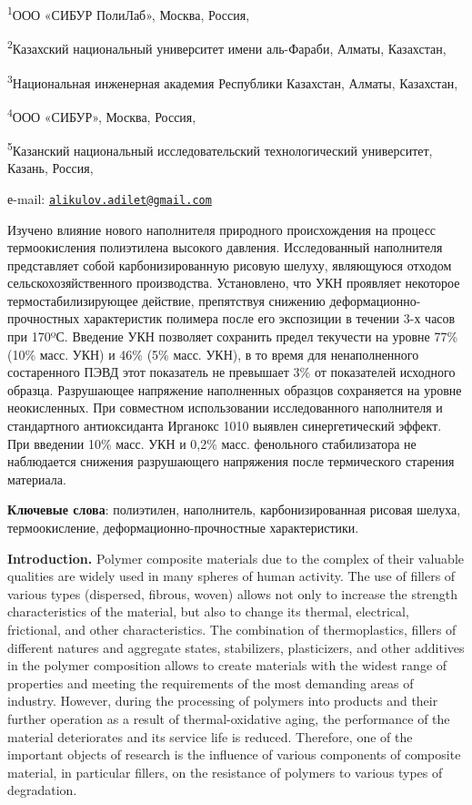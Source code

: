 \textsuperscript{1}ООО «СИБУР ПолиЛаб», Москва, Россия,

\textsuperscript{2}Казахский национальный университет имени аль-Фараби,
Алматы, Казахстан,

\textsuperscript{3}Национальная инженерная академия Республики
Казахстан, Алматы, Казахстан,

\textsuperscript{4}ООО «СИБУР», Москва, Россия,

\textsuperscript{5}Казанский национальный исследовательский
технологический университет, Казань, Россия,

е-mail:
\href{mailto:alikulov.adilet@gmail.com}{\nolinkurl{alikulov.adilet@gmail.com}}

Изучено влияние нового наполнителя природного происхождения на процесс
термоокисления полиэтилена высокого давления. Исследованный наполнителя
представляет собой карбонизированную рисовую шелуху, являющуюся отходом
сельскохозяйственного производства. Установлено, что УКН проявляет
некоторое термостабилизирующее действие, препятствуя снижению
деформационно-прочностных характеристик полимера после его экспозиции в
течении 3-х часов при 170ºС. Введение УКН позволяет сохранить предел
текучести на уровне 77\% (10\% масс. УКН) и 46\% (5\% масс. УКН), в то
время для ненаполненного состаренного ПЭВД этот показатель не превышает
3\% от показателей исходного образца. Разрушающее напряжение наполненных
образцов сохраняется на уровне неокисленных. При совместном
использовании исследованного наполнителя и стандартного антиоксиданта
Ирганокс 1010 выявлен синергетический эффект. При введении 10\% масс.
УКН и 0,2\% масс. фенольного стабилизатора не наблюдается снижения
разрушающего напряжения после термического старения материала.

{\bfseries Ключевые слова}: полиэтилен, наполнитель, карбонизированная
рисовая шелуха, термоокисление, деформационно-прочностные
характеристики.

{\bfseries Introduction.} Polymer composite materials due to the complex of
their valuable qualities are widely used in many spheres of human
activity. The use of fillers of various types (dispersed, fibrous,
woven) allows not only to increase the strength characteristics of the
material, but also to change its thermal, electrical, frictional, and
other characteristics. The combination of thermoplastics, fillers of
different natures and aggregate states, stabilizers, plasticizers, and
other additives in the polymer composition allows to create materials
with the widest range of properties and meeting the requirements of the
most demanding areas of industry. However, during the processing of
polymers into products and their further operation as a result of
thermal-oxidative aging, the performance of the material deteriorates
and its service life is reduced. Therefore, one of the important objects
of research is the influence of various components of composite
material, in particular fillers, on the resistance of polymers to
various types of degradation.

